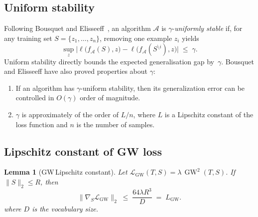 \documentclass{article}
\newtheorem{lemma}{Lemma}
\begin{document}
\subsection{Uniform stability}
Following Bousquet and Elisseeff~\cite{bousquet2002stability},
an algorithm \(\mathcal{A}\) is \(\gamma\)-\emph{uniformly stable}
if, for any training set
\(S=\{z_{1},\dots,z_{n}\}\),
removing one example \(z_{i}\) yields
\begin{equation}
  \sup_{z}
  \bigl|
    \ell\!\bigl(f_{\mathcal{A}}(S),z\bigr)
    -
    \ell\!\bigl(f_{\mathcal{A}}(S^{\setminus i}),z\bigr)
  \bigr|
  \;\le\;\gamma .
  \label{eq:uniform-stability}
\end{equation}
Uniform stability directly bounds the expected generalisation gap by~\(\gamma\). Bousquet and Elisseeff have also proved properties about $\gamma$:
\begin{enumerate}
    \item If an algorithm has $\gamma$-uniform stability, then its generalization error can be controlled in $O(\gamma)$ order of magnitude.
    \item $\gamma$ is approximately of the order of $L/n$, where $L$ is a Lipschitz constant of the loss function and $n$ is the number of samples.
\end{enumerate}

\subsection{Lipschitz constant of GW loss}

\begin{lemma}[GW\,Lipschitz constant]
\label{lem:gw-lip}
Let
\(\mathcal{L}_{\mathrm{GW}}(T,S)
  =\lambda\,\operatorname{GW}^{2}(T,S)\).
If \(\|S\|_{2}\le R\),
then
\[
  \bigl\|\nabla_{S}\mathcal{L}_{\mathrm{GW}}\bigr\|_{2}
  \;\le\;
  \frac{64\lambda R^3}{D}
  \; =\; L_{\mathrm{GW}} .
\]
where $D$ is the vocabulary size.
\end{lemma}
\end{document}
